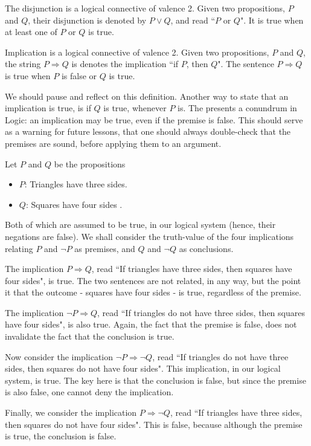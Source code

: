\begin{definition}
The disjunction is a logical connective of valence 2. Given two propositions, $P$ and $Q$, their disjunction is denoted by $P \lor Q$, and read ``$P$ or $Q$". It is true when at least one of $P$ or $Q$ is true.
\end{definition}

\begin{definition}
Implication is a logical connective of valence 2. Given two propositions, $P$ and $Q$, the string $P\Rightarrow Q$ is denotes the implication ``if $P$, then $Q$". The sentence $P\Rightarrow Q$ is true when $P$ is false or $Q$ is true.
\end{definition}

We should pause and reflect on this definition. Another way to state that an implication is true, is if $Q$ is true, whenever $P$ is. 
The presents a conundrum in Logic: an implication may be true, even if the premise is false. This should serve as a warning for future lessons, that one should always double-check that the premises are sound, before applying them to an argument. 

\begin{example}
Let $P$ and $Q$ be the propositions
\begin{itemize}
\item $P$: Triangles have three sides.
\item $Q$: Squares have four sides .
\end{itemize}

Both of which are assumed to be true, in our logical system (hence, their negations are false). 
We shall consider the truth-value of the four implications relating $P$ and $\neg P$ as premises, and $Q$ and $\neg Q$ as conclusions. 

The implication $P \Rightarrow Q$, read ``If triangles have three sides, then squares have four sides", is true. The two sentences are not related, in any way, but the point it that the outcome - squares have four sides - is true, regardless of the premise. 

The implication $\neg P \Rightarrow Q$, read ``If triangles do not have three sides, then squares have four sides", is also true. Again, the fact that the premise is false, does not invalidate the fact that the conclusion is true. 

Now consider the implication $\neg P \Rightarrow \neg Q$, read ``If triangles do not have three sides, then squares do not have four sides". This implication, in our logical system, is true. The key here is that the conclusion is false, but since the premise is also false, one cannot deny the implication. 

Finally, we consider the implication $P \Rightarrow \neg Q$, read ``If triangles have three sides, then squares do not have four sides". This is false, because although the premise is true, the conclusion is false. 
\end{example}

